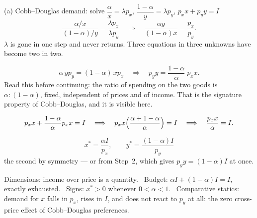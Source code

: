 \begin{worked}{(a) Cobb--Douglas demand: solve $\dfrac{\alpha}{x}=\lambda p_{x}$, $\dfrac{1-\alpha}{y}=\lambda p_{y}$, $p_{x}x+p_{y}y=I$}
\[
  \frac{\alpha/x}{(1-\alpha)/y}=\frac{\lambda p_{x}}{\lambda p_{y}}
  \quad\Longrightarrow\quad
  \frac{\alpha y}{(1-\alpha)x}=\frac{p_{x}}{p_{y}} .
\]
$\lambda$ is gone in one step and never returns. Three equations in three
unknowns have become two in two.

\[
  \alpha\, y p_{y}=(1-\alpha)\,x p_{x}
  \quad\Longrightarrow\quad
  p_{y}y=\frac{1-\alpha}{\alpha}\;p_{x}x .
\]
Read this before continuing: the ratio of spending on the two goods is
$\alpha:(1-\alpha)$, fixed, independent of prices and of income. That is the
signature property of Cobb--Douglas, and it is visible here.

\[
  p_{x}x+\frac{1-\alpha}{\alpha}p_{x}x=I
  \quad\Longrightarrow\quad
  p_{x}x\Bigl(\frac{\alpha+1-\alpha}{\alpha}\Bigr)=I
  \quad\Longrightarrow\quad
  \frac{p_{x}x}{\alpha}=I .
\]

\[
  \boxed{\;x^{*}=\frac{\alpha I}{p_{x}},\qquad
         y^{*}=\frac{(1-\alpha)I}{p_{y}}\;}
\]
the second by symmetry --- or from Step~2, which gives $p_{y}y=(1-\alpha)I$
at once.

Dimensions: income over price is a quantity. \checkmark\ Budget:
$\alpha I+(1-\alpha)I=I$, exactly exhausted. \checkmark\ Signs: $x^{*}>0$
whenever $0<\alpha<1$. \checkmark\ Comparative statics: demand for $x$ falls
in $p_{x}$, rises in $I$, and does not react to $p_{y}$ at all: the
zero cross-price effect of Cobb--Douglas preferences.
\end{worked}

